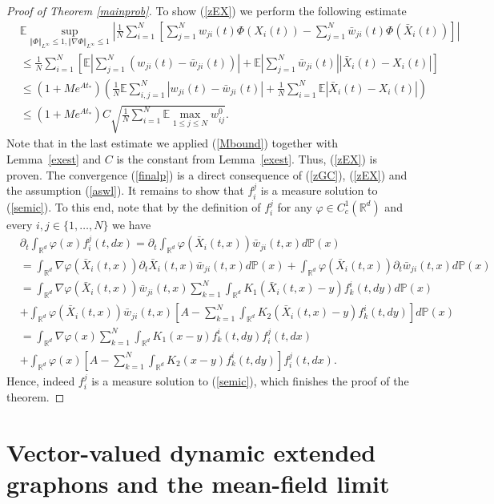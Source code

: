 \documentclass[10pt]{article}
\newcommand*{\norm}[1]{\left\Vert{#1}\right\Vert}
\newcommand*{\abs}[1]{\left\vert{#1}\right\vert}
\newcommand{\vf}{\varphi}
\newcommand{\R}{\mathbb{R}}
\newcommand{\ird}{\int_{\mathbb{R}^d}}
\newcommand{\sn}{\frac{1}{N}\sum_{i=1}^N}
\newcommand{\xb}{\bar{X}}
\newcommand{\p}{\mathbb{P}}
\newcommand{\E}{\mathbb{E}}
\newcommand{\wji}{w_{ji}}
\newcommand{\wjib}{\bar{w}_{ji}}
\newcommand{\fji}{f^j_i}
\newcommand{\fik}{f^i_k}
\begin{document}
\begin{proof}[Proof of Theorem \ref{mainprob}]
To show (\ref{zEX}) we perform the following estimate
\begin{align*}
&\E \sup_{\norm{\Phi}_{L^\infty}\leq 1, \norm{\nabla \Phi}_{L^\infty}\leq 1 }\abs{\sn \left[\sum_{j=1}^N \wji(t)\Phi(X_i(t)) - \sum_{j=1}^N \wjib(t)\Phi(\xb_i(t))\right]}\\
&\leq \sn \left[\E\abs{\sum_{j=1}^N (\wji(t)- \wjib(t))} + \E\abs{\sum_{j=1}^N \wjib(t)}\abs{\xb_i(t)-X_i(t)}\right]
\\
&\leq (1+Me^{At_{*}})\left(\frac{1}{N} \E\sum_{i,j=1}^N \abs{\wji(t)-\wjib(t)} +\frac{1}{N}\sum_{i=1}^N\E\abs{\xb_i(t)-X_i(t)}\right) 
\\
&\leq (1+Me^{At_{*}}) C\sqrt{\frac{1}{N}\sum_{i=1}^N\E \max_{1\leq j \leq N}w^0_{ij}}.
\end{align*}
Note that in the last estimate we applied (\ref{Mbound}) together with  Lemma~\ref{exest} and $C$ is the constant from Lemma~\ref{exest}. Thus, (\ref{zEX}) is proven. The convergence (\ref{finalp}) is a direct consequence of (\ref{zGC}), (\ref{zEX}) and the assumption (\ref{aswl}). It remains to show that $\fji$ is a measure solution to (\ref{semic}). To this end, note that by the definition of $\fji$  for any $\vf \in C_{c}^1(\R^d)$ and every $i,j \in \{1,\dots,N\}$ we have
\begin{align*}
 &\partial_t \ird \vf(x)\fji(t,dx) = \partial_t \ird \vf(\xb_i(t,x))\wjib(t,x)d\p(x)  \\
 &=\ird \nabla \vf(\xb_i(t,x)) \partial_t \xb_i(t,x) \wjib(t,x)d\p(x) + \ird  \vf(\xb_i(t,x)) \partial_t \wjib(t,x)d\p(x)\\
 &=\ird \nabla \vf(\xb_i(t,x)) \wjib(t,x)\sum_{k=1}^N  \ird K_{1}(\xb_i(t,x)-y)\fik(t,dy) d\p(x)\\
 &+  \ird  \vf(\xb_i(t,x)) \wjib(t,x)\left[A-\sum_{k=1}^N \ird K_{2}(\xb_i(t,x)-y)\fik(t,dy)\right]d\p(x)\\
 & = \ird \nabla \vf(x) \sum_{k=1}^N  \ird K_{1}(x-y)\fik(t,dy) \fji(t,dx)\\
 &+ \ird  \vf(x) \left[A-\sum_{k=1}^N  \ird K_{2}(x-y)\fik(t,dy)\right]\fji(t,dx).
\end{align*}
Hence, indeed $\fji$ is a measure solution to (\ref{semic}), which finishes the proof of the theorem.
\end{proof}


\section{Vector-valued dynamic extended graphons and  the mean-field limit}
\end{document}

